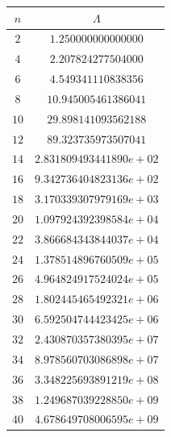 \begin{center}
	\begin{tabular}{|c|c|}
		\hline
		$n$ & $\Lambda$ \\
		\hline
		$2$  & $1.250000000000000$ \\ 
		$4$  & $2.207824277504000$ \\ 
		$6$  & $4.549341110838356$ \\ 
		$8$  & $10.945005461386041$ \\ 
		$10$ & $29.898141093562188$ \\ 
		$12$ & $89.323735973507041$ \\ 
		$14$ & $2.831809493441890e+02$ \\ 
		$16$ & $9.342736404823136e+02$ \\ 
		$18$ & $3.170339307979169e+03$ \\ 
		$20$ & $1.097924392398584e+04$ \\ 
		$22$ & $3.866684343844037e+04$ \\ 
		$24$ & $1.378514896760509e+05$ \\ 
		$26$ & $4.964824917524024e+05$ \\ 
		$28$ & $1.802445465492321e+06$ \\ 
		$30$ & $6.592504744423425e+06$ \\ 
		$32$ & $2.430870357380395e+07$ \\ 
		$34$ & $8.978560703086898e+07$ \\ 
		$36$ & $3.348225693891219e+08$ \\ 
		$38$ & $1.249687039228850e+09$ \\ 
		$40$ & $4.678649708006595e+09$ \\ 
		\hline
	\end{tabular}
\end{center} 
